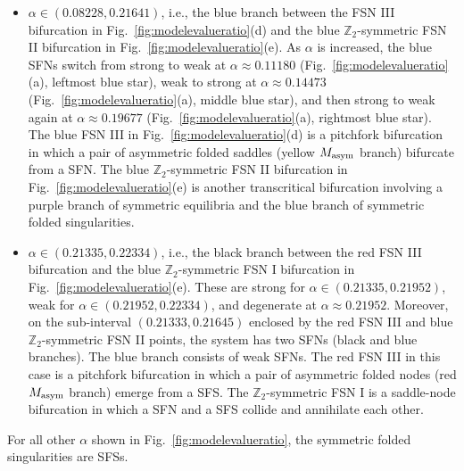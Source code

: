 \documentclass[10pt,onecolumn]{article}
\theoremstyle{plain}
\begin{document}
\begin{itemize}
Moreover, on the sub-interval $\alpha \in (0.08228,0.09341)$, i.e., between the blue FSN III and red FSN III bifurcations, the system possesses two SFNs (black and blue branches), one on $L^d$ and the other on $L^u$. The blue branch consists of strong SFNs. 
The black $\mathbb Z_2$-symmetric FSN II in this case is a transcritical bifurcation in which a symmetric node equilibrium (purple $E_{\rm sym}$ branch) and a SFS pass through each other and swap types. 
The red FSN III is a pitchfork bifurcation in which a pair of asymmetric folded saddles (red $M_{\rm asym}$ branch) emerge from a SFN. 
\item $\alpha \in (0.08228,0.21641)$, i.e., the blue branch between the FSN III bifurcation in Fig.~\ref{fig:modelevalueratio}(d) and the blue $\mathbb Z_2$-symmetric FSN II bifurcation in Fig.~\ref{fig:modelevalueratio}(e). 
As $\alpha$ is increased, the blue SFNs switch from strong to weak at $\alpha \approx 0.11180$ (Fig.~\ref{fig:modelevalueratio}(a), leftmost blue star), weak to strong at $\alpha \approx 0.14473$ (Fig.~\ref{fig:modelevalueratio}(a), middle blue star), and then strong to weak again at $\alpha \approx 0.19677$ (Fig.~\ref{fig:modelevalueratio}(a), rightmost blue star). 
The blue FSN III in Fig.~\ref{fig:modelevalueratio}(d) is a pitchfork bifurcation in which a pair of asymmetric folded saddles (yellow $M_{\rm asym}$ branch) bifurcate from a SFN. 
The blue $\mathbb Z_2$-symmetric FSN II bifurcation in Fig.~\ref{fig:modelevalueratio}(e) is another transcritical bifurcation involving a purple branch of symmetric equilibria and the blue branch of symmetric folded singularities. 
\item $\alpha \in (0.21335,0.22334)$, i.e., the black branch between the red FSN III bifurcation and the blue $\mathbb Z_2$-symmetric FSN I bifurcation in Fig.~\ref{fig:modelevalueratio}(e). These are strong for $\alpha \in (0.21335,0.21952)$, weak for $\alpha \in (0.21952,0.22334)$, and degenerate at $\alpha \approx 0.21952$.
Moreover, on the sub-interval $(0.21333,0.21645)$ enclosed by the red FSN III and blue $\mathbb Z_2$-symmetric FSN II points, the system has two SFNs (black and blue branches). The blue branch consists of weak SFNs. 
The red FSN III in this case is a pitchfork bifurcation in which a pair of asymmetric folded nodes (red $M_{\rm asym}$ branch) emerge from a SFS.
The $\mathbb Z_2$-symmetric FSN I is a saddle-node bifurcation in which a SFN and a SFS collide and annihilate each other. 
\end{itemize}
For all other $\alpha$ shown in Fig.~\ref{fig:modelevalueratio}, the symmetric folded singularities are SFSs. 
\end{document}
